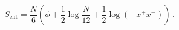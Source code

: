 \begin{equation}
S_{\text{ent}} = \frac{N}{6} \left(
\phi + \frac{1}{2} \log \frac{N}{12} + \frac{1}{2} \log \left( -x^+ x^-
\right) \right)\, .
\end{equation}

